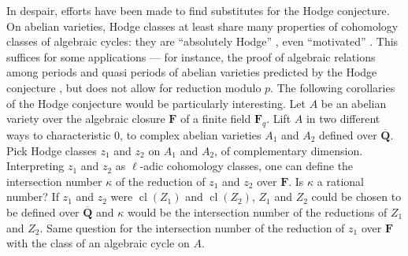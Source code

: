 \documentclass[11pt,a4paper]{article}
\theoremstyle{plain}
\theoremstyle{definition}
\DeclareMathOperator{\cl}{cl}
\begin{document}
In despair, efforts have been made to find substitutes for the Hodge conjecture. On abelian varieties, Hodge classes at least share many properties of cohomology classes of algebraic cycles: they are ``absolutely Hodge'' \cite{deligne-brylinski1980}, even ``motivated'' \cite{andre1996}. This suffices for some applications --- for instance, the proof of algebraic relations among periods and quasi periods of abelian varieties predicted by the Hodge conjecture \cite{deligne-brylinski1980}, but does not allow for reduction modulo $p$. The following corollaries of the Hodge conjecture would be particularly interesting. Let $A$ be an abelian variety over the algebraic closure $\mathbf{F}$ of a finite field $\mathbf{F}_{q}$. Lift $A$ in two different ways to characteristic $0$, to complex abelian varieties $A_{1}$ and $A_{2}$ defined over $\overline{\mathbf{Q}}$. Pick Hodge classes $z_{1}$ and $z_{2}$ on $A_{1}$ and $A_{2}$, of complementary dimension. Interpreting $z_{1}$ and $z_{2}$ as $\ell$-adic cohomology classes, one can define the intersection number $\kappa$ of the reduction of $z_{1}$ and $z_{2}$ over $\mathbf{F}$. Is $\kappa$ a rational number? If $z_{1}$ and $z_{2}$ were $\cl(Z_{1})$ and $\cl(Z_{2})$, $Z_{1}$ and $Z_{2}$ could be chosen to be defined over $\overline{\mathbf{Q}}$ and $\kappa$ would be the intersection number of the reductions of $Z_{1}$ and $Z_{2}$. Same question for the intersection number of the reduction of $z_{1}$ over $\mathbf{F}$ with the class of an algebraic cycle on $A$.
\end{document}
